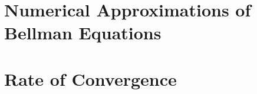 \documentclass[12pt]{article}
\newcommand{\dge}[1]{\textcolor{blue}{$^{\textrm{dge}}${#1}}}
\newcommand{\tjs}[1]{\textcolor{red}{$^{\textrm{tjs}}${#1}}}
\begin{document}
% 




\begin{appendix}
 \section{Numerical Approximations of Bellman Equations\label{sec:app_numerical}}
 
 \section{Rate of Convergence\label{sec:app_convergence}}
 
\end{appendix}

% 



\end{document}
